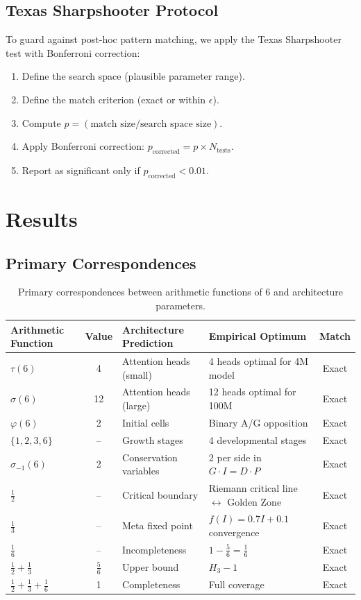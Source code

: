 \documentclass[12pt]{article}
\begin{document}
\subsection{Texas Sharpshooter Protocol}

To guard against post-hoc pattern matching, we apply the Texas Sharpshooter test with Bonferroni correction:

\begin{enumerate}
    \item Define the search space (plausible parameter range).
    \item Define the match criterion (exact or within $\epsilon$).
    \item Compute $p = (\text{match size} / \text{search space size})$.
    \item Apply Bonferroni correction: $p_{\text{corrected}} = p \times N_{\text{tests}}$.
    \item Report as significant only if $p_{\text{corrected}} < 0.01$.
\end{enumerate}

\section{Results}

\subsection{Primary Correspondences}

\begin{table}[h]
\centering
\small
\begin{tabular}{lcllc}
\toprule
Arithmetic Function & Value & Architecture Prediction & Empirical Optimum & Match \\
\midrule
$\tau(6)$ & 4 & Attention heads (small) & 4 heads optimal for 4M model & Exact \\
$\sigma(6)$ & 12 & Attention heads (large) & 12 heads optimal for 100M & Exact \\
$\varphi(6)$ & 2 & Initial cells & Binary A/G opposition & Exact \\
$\{1,2,3,6\}$ & -- & Growth stages & 4 developmental stages & Exact \\
$\sigma_{-1}(6)$ & 2 & Conservation variables & 2 per side in $G \cdot I = D \cdot P$ & Exact \\
$\frac{1}{2}$ & -- & Critical boundary & Riemann critical line $\leftrightarrow$ Golden Zone & Exact \\
$\frac{1}{3}$ & -- & Meta fixed point & $f(I)=0.7I+0.1$ convergence & Exact \\
$\frac{1}{6}$ & -- & Incompleteness & $1 - \frac{5}{6} = \frac{1}{6}$ & Exact \\
$\frac{1}{2}+\frac{1}{3}$ & $\frac{5}{6}$ & Upper bound & $H_3 - 1$ & Exact \\
$\frac{1}{2}+\frac{1}{3}+\frac{1}{6}$ & 1 & Completeness & Full coverage & Exact \\
\bottomrule
\end{tabular}
\caption{Primary correspondences between arithmetic functions of 6 and architecture parameters.}
\label{tab:primary}
\end{table}
\end{document}
